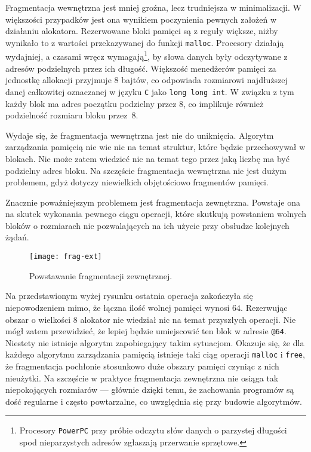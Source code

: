 \documentclass[12pt,a4paper,titlepage,twoside]{mwart}
\begin{document}
Fragmentacja wewnętrzna jest mniej groźna, lecz trudniejsza w minimalizacji. W
większości przypadków jest ona wynikiem poczynienia pewnych założeń w działaniu
alokatora. Rezerwowane bloki pamięci są z reguły większe, niżby wynikało to z
wartości przekazywanej do funkcji \texttt{malloc}. Procesory działają
wydajniej, a czasami wręcz wymagają\footnote{Procesory \texttt{PowerPC} przy
próbie odczytu słów danych o parzystej długości spod nieparzystych adresów
zgłaszają przerwanie sprzętowe.}, by słowa danych były odczytywane z adresów
podzielnych przez ich długość. Większość menedżerów pamięci za jednostkę
allokacji przyjmuje $8$ bajtów, co odpowiada rozmiarowi najdłuższej danej
całkowitej oznaczanej w języku \verb+C+ jako \verb+long long int+. W związku z
tym każdy blok ma adres początku podzielny przez $8$, co implikuje również 
podzielność rozmiaru bloku przez~$8$.

Wydaje się, że fragmentacja wewnętrzna jest nie do uniknięcia. Algorytm
zarządzania pamięcią nie wie nic na temat struktur, które będzie przechowywał w
blokach. Nie może zatem wiedzieć nic na temat tego przez jaką liczbę ma być
podzielny adres bloku. Na szczęście fragmentacja wewnętrzna nie jest dużym
problemem, gdyż dotyczy niewielkich objętościowo fragmentów pamięci.

Znacznie poważniejszym problemem jest fragmentacja zewnętrzna. Powstaje ona na
skutek wykonania pewnego ciągu operacji, które skutkują powstaniem wolnych
bloków o rozmiarach nie pozwalających na ich użycie przy obsłudze kolejnych
żądań.

\begin{figure}[h]
\centering
\texttt{[image: frag-ext]}
\caption{Powstawanie fragmentacji zewnętrznej.}
\end{figure}

Na przedstawionym wyżej rysunku ostatnia operacja zakończyła się niepowodzeniem
mimo, że łączna ilość wolnej pamięci wynosi $64$. Rezerwując obszar o wielkości
$8$ alokator nie wiedział nic na temat przyszłych operacji. Nie mógł zatem
przewidzieć, że lepiej będzie umiejscowić ten blok w adresie \verb+@64+.
Niestety nie istnieje algorytm zapobiegający takim sytuacjom. Okazuje się, że
dla każdego algorytmu zarządzania pamięcią istnieje taki ciąg operacji
\texttt{malloc} i \texttt{free}, że fragmentacja pochłonie stosunkowo duże
obszary pamięci czyniąc z nich nieużytki. Na szczęście w praktyce fragmentacja
zewnętrzna nie osiąga tak niepokojących rozmiarów --- głównie dzięki temu, że
zachowania programów są dość regularne i często powtarzalne, co uwzględnia się
przy budowie algorytmów.
\end{document}

